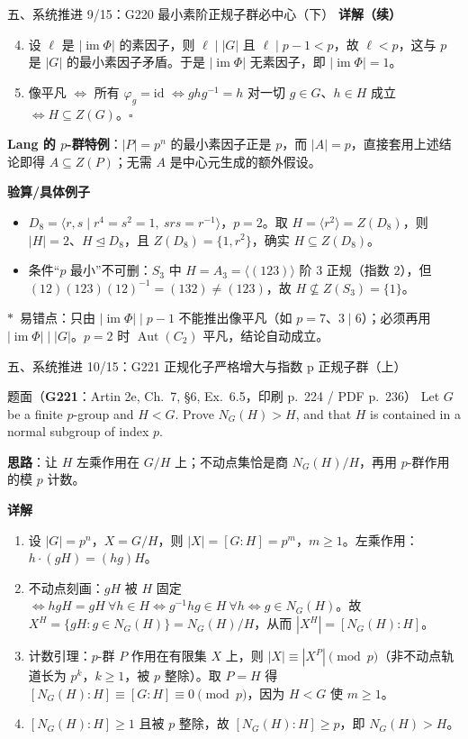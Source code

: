 \documentclass[aspectratio=169,10pt,fontset=none]{ctexbeamer}
\newcommand{\ex}[1]{\textcolor{accent}{\footnotesize\bfseries #1}}
\newcommand{\key}[1]{\textcolor{ink}{\bfseries #1}}
\newcommand{\starpt}{\textcolor{accent}{\bfseries$\ast$}}
\begin{document}
\begin{frame}[t]{五、系统推进 9/15：G220 最小素阶正规子群必中心（下）}
\scriptsize
\key{详解（续）}
\begin{enumerate}
  \setcounter{enumi}{3}
  \item 设 $\ell$ 是 $|\operatorname{im}\Phi|$ 的素因子，则 $\ell\mid|G|$ 且 $\ell\mid p-1<p$，故 $\ell<p$，这与 $p$ 是 $|G|$ 的最小素因子矛盾。于是 $|\operatorname{im}\Phi|$ 无素因子，即 $|\operatorname{im}\Phi|=1$。
  \item 像平凡 $\iff$ 所有 $\varphi_g=\mathrm{id}$ $\iff ghg^{-1}=h$ 对一切 $g\in G$、$h\in H$ 成立 $\iff H\subseteq Z(G)$。$\square$
\end{enumerate}
\key{Lang 的 $p$-群特例}：$|P|=p^n$ 的最小素因子正是 $p$，而 $|A|=p$，直接套用上述结论即得 $A\subseteq Z(P)$；无需 $A$ 是中心元生成的额外假设。

\key{验算/具体例子}
\begin{itemize}
  \item $D_8=\langle r,s\mid r^4=s^2=1,\ srs=r^{-1}\rangle$，$p=2$。取 $H=\langle r^2\rangle=Z(D_8)$，则 $|H|=2$、$H\trianglelefteq D_8$，且 $Z(D_8)=\{1,r^2\}$，确实 $H\subseteq Z(D_8)$。
  \item 条件“$p$ 最小”不可删：$S_3$ 中 $H=A_3=\langle(123)\rangle$ 阶 $3$ 正规（指数 $2$），但 $(12)(123)(12)^{-1}=(132)\ne(123)$，故 $H\not\subseteq Z(S_3)=\{1\}$。
\end{itemize}
\starpt~易错点：只由 $|\operatorname{im}\Phi|\mid p-1$ 不能推出像平凡（如 $p=7$、$3\mid 6$）；必须再用 $|\operatorname{im}\Phi|\mid|G|$。$p=2$ 时 $\operatorname{Aut}(C_2)$ 平凡，结论自动成立。
\end{frame}

\begin{frame}[t]{五、系统推进 10/15：G221 正规化子严格增大与指数 p 正规子群（上）}
\label{ex:G221}\leavevmode
\scriptsize
\begin{block}{\footnotesize 题面（\ex{G221}：Artin 2e, Ch.~7, \S6, Ex.~6.5，印刷 p.~224 / PDF p.~236）}
Let $G$ be a finite $p$-group and $H<G$. Prove $N_G(H)>H$, and that $H$ is contained in a normal subgroup of index $p$.
\end{block}
\key{思路}：让 $H$ 左乘作用在 $G/H$ 上；不动点集恰是商 $N_G(H)/H$，再用 $p$-群作用的模 $p$ 计数。

\key{详解}
\begin{enumerate}
  \item 设 $|G|=p^n$，$X=G/H$，则 $|X|=[G:H]=p^m$，$m\ge1$。左乘作用：$h\cdot(gH)=(hg)H$。
  \item 不动点刻画：$gH$ 被 $H$ 固定 $\iff hgH=gH\ \forall h\in H\iff g^{-1}hg\in H\ \forall h\iff g\in N_G(H)$。故 $X^H=\{gH:g\in N_G(H)\}=N_G(H)/H$，从而 $|X^H|=[N_G(H):H]$。
  \item 计数引理：$p$-群 $P$ 作用在有限集 $X$ 上，则 $|X|\equiv|X^P|\pmod p$（非不动点轨道长为 $p^k$，$k\ge1$，被 $p$ 整除）。取 $P=H$ 得 $[N_G(H):H]\equiv[G:H]\equiv0\pmod p$，因为 $H<G$ 使 $m\ge1$。
  \item $[N_G(H):H]\ge1$ 且被 $p$ 整除，故 $[N_G(H):H]\ge p$，即 $N_G(H)>H$。
\end{enumerate}
\end{frame}
\end{document}
